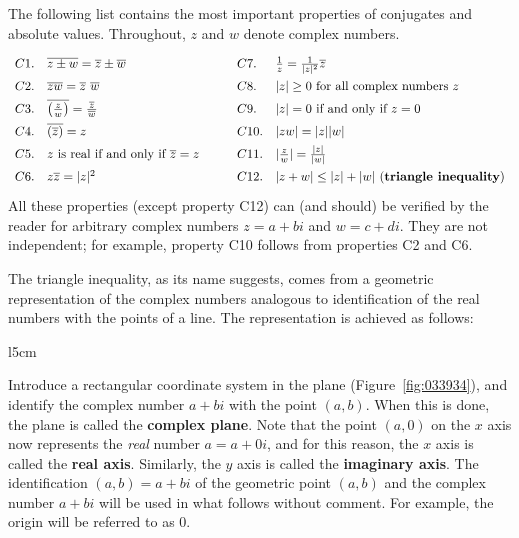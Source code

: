 The following list contains the most important properties of conjugates and absolute values. Throughout, $z$ and $w$ denote complex numbers.
\begin{equation*}
\def\arraystretch{1.5}
\begin{array}{llcll}
C1. & \overline{z \pm w} = \overline{z} \pm \overline{w} & \quad & C7. & \frac{1}{z} = \frac{1}{|z|^2}\overline{z} \\
C2. & \overline{zw} = \overline{z}~\overline{w} & \quad & C8. & |z| \geq 0 \mbox{ for all complex numbers } z \\
C3. & \overline{\left(\frac{z}{w}\right)} = \frac{\overline{z}}{\hspace{0.05em}\overline{w}\hspace{0.05em}} & \quad & C9. & |z| = 0 \mbox{ if and only if } z=0 \\
C4. & \overline{(\overline{z})} = z & \quad & C10. & |zw| = |z||w| \\
C5. & z \mbox{ is real if and only if } \overline{z} =z  & \quad & C11. & |\frac{z}{w}| = \frac{|z|}{|w|} \\
C6. & z\overline{z} = |z|^2 & \quad & C12. & |z+w| \leq |z|+|w| \mbox{ (\textbf{triangle inequality})}\index{complex number!triangle inequality}\index{triangle!inequality}\index{triangle inequality} \\
\end{array}
\end{equation*}
All these properties (except property C12) can (and should) be verified by the reader for arbitrary complex numbers $z = a + bi$ and $w = c + di$. They are not independent; for example, property C10 follows from properties C2 and C6.

The triangle inequality, as its name 
suggests, comes from a geometric representation of the complex numbers 
analogous to identification of the real numbers with the points of a 
line. The representation is achieved as follows:

\begin{wrapfigure}{l}{5cm}
	\centering
	
	\caption{\label{fig:033934}}
\end{wrapfigure}

Introduce a rectangular coordinate system in the plane (Figure~\ref{fig:033934}), and identify the complex number $a + bi$ with the point $(a, b)$. When this is done, the plane is called the \textbf{complex plane}. Note that the point $(a, 0)$ on the $x$ axis now represents the \textit{real} number $a = a + 0i$, and for this reason, the $x$ axis is called the \textbf{real axis}. Similarly, the $y$ axis is called the \textbf{imaginary axis}. The identification $(a, b) = a + bi$ of the geometric point $(a, b)$ and the complex number $a + bi$ will be used in what follows without comment. For example, the origin will be referred to as $0$.

